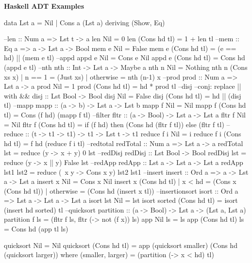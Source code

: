 \begin{breakbox}
\textbf{Haskell ADT Examples}
\begin{haskellcode}
data Lst a = Nil | Cons a (Lst a) deriving (Show, Eq)

--len :: Num a => Lst t -> a
len Nil = 0
len (Cons hd tl) = 1 + len tl
--mem :: Eq a => a -> Lst a -> Bool
mem e Nil = False
mem e (Cons hd tl) = (e == hd) || (mem e tl)
--appd
appd e Nil = Cons e Nil
appd e (Cons hd tl) = Cons hd (appd e tl)
--nth
nth :: Int -> Lst a -> Maybe a
nth n Nil = Nothing
nth n (Cons xs x) | n == 1 = (Just xs)
                  | otherwise = nth (n-1) x
--prod
prod :: Num a => Lst a -> a
prod Nil = 1
prod (Cons hd tl) = hd * prod tl
--disj --conj: replace || with &&
disj :: Lst Bool -> Bool
disj Nil = False
disj (Cons hd tl) = hd || (disj tl)
--mapp
mapp :: (a -> b) -> Lst a -> Lst b
mapp f Nil = Nil
mapp f (Cons hd tl) = Cons (f hd) (mapp f tl)
--filter
fltr :: (a -> Bool) -> Lst a -> Lst a
fltr f Nil = Nil
fltr f (Cons hd tl) = if (f hd) then 
			(Cons hd (fltr f tl)) else (fltr f tl)
--reduce :: (t -> t1 -> t1) -> t1 -> Lst t -> t1
reduce f i Nil = i
reduce f i (Cons hd tl) = f hd (reduce f i tl)
--redtotal
redTotal :: Num a => Lst a -> a
redTotal lst = reduce (\x y -> x + y) 0 lst
--redDisj
redDisj :: Lst Bool -> Bool
redDisj lst = reduce (\x y -> x || y) False lst
--redApp
redApp :: Lst a -> Lst a -> Lst a
redApp lst1 lst2 = reduce (\ x y -> Cons x y) lst2 lst1
--insert
insert :: Ord a => a -> Lst a -> Lst a
insert x Nil = Cons x Nil
insert x (Cons hd tl) | x < hd = (Cons x (Cons hd tl))
                      | otherwise = (Cons hd (insert x tl))
--insertionsort
isort :: Ord a => Lst a -> Lst a -> Lst a
isort lst Nil = lst
isort sorted (Cons hd tl) = isort (insert hd sorted) tl
--quicksort
partition :: (a -> Bool) -> Lst a -> (Lst a, Lst a)
partition f ls = (fltr f ls, fltr (\x -> not (f x)) ls)
app Nil ls = ls
app (Cons hd tl) ls = Cons hd (app tl ls)

quicksort Nil = Nil
quicksort (Cons hd tl) = app (quicksort smaller) 
			(Cons hd (quicksort larger))
  where
    (smaller, larger) = (partition (\x -> x < hd) tl)
\end{haskellcode}
\end{breakbox}

